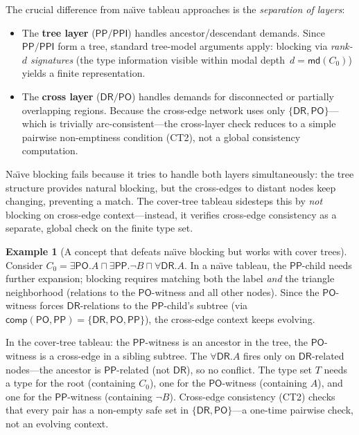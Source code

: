 \documentclass[
]{ceurart}
\theoremstyle{definition}
\newtheorem{examplex}[theorem]{Example}
\newcommand{\DR}{\ensuremath{\mathsf{DR}}}
\newcommand{\PO}{\ensuremath{\mathsf{PO}}}
\newcommand{\PP}{\ensuremath{\mathsf{PP}}}
\newcommand{\PPI}{\ensuremath{\mathsf{PPI}}}
\newcommand{\comp}{\ensuremath{\mathsf{comp}}}
\newcommand{\md}{\ensuremath{\mathsf{md}}}
\begin{document}
The crucial difference from na\"{\i}ve tableau approaches is the
\emph{separation of layers}:

\begin{itemize}
  \item The \textbf{tree layer} ($\PP/\PPI$) handles
    ancestor/descendant demands.  Since $\PP/\PPI$ form a tree,
    standard tree-model arguments apply: blocking via
    \emph{rank-$d$ signatures} (the type information visible
    within modal depth~$d = \md(C_0)$) yields a finite
    representation.

  \item The \textbf{cross layer} ($\DR/\PO$) handles demands for
    disconnected or partially overlapping regions.  Because the
    cross-edge network uses only $\{\DR,\PO\}$---which is
    trivially arc-consistent---the cross-layer check reduces to a
    simple pairwise non-emptiness condition (CT2), not a global
    consistency computation.
\end{itemize}

Na\"{\i}ve blocking fails because it tries to handle both layers
simultaneously: the tree structure provides natural blocking, but
the cross-edges to distant nodes keep changing, preventing a match.
The cover-tree tableau sidesteps this by \emph{not} blocking on
cross-edge context---instead, it verifies cross-edge consistency
as a separate, global check on the finite type set.

\begin{examplex}[A concept that defeats na\"{\i}ve blocking but
  works with cover trees]
\label{ex:cover-tree-win}
Consider $C_0 = \exists\PO.A \sqcap \exists\PP.\neg B \sqcap
\forall\DR.A$.
In a na\"{\i}ve tableau, the $\PP$-child needs further expansion;
blocking requires matching both the label \emph{and} the
triangle neighborhood (relations to the $\PO$-witness and all
other nodes).  Since the $\PO$-witness forces $\DR$-relations
to the $\PP$-child's subtree (via $\comp(\PO, \PP) = \{\DR,\PO,\PP\}$),
the cross-edge context keeps evolving.

In the cover-tree tableau: the $\PP$-witness is an ancestor in
the tree, the $\PO$-witness is a cross-edge in a sibling subtree.
The $\forall\DR.A$ fires only on $\DR$-related nodes---the
ancestor is $\PP$-related (not $\DR$), so no conflict.
The type set $T$ needs a type for the root (containing $C_0$),
one for the $\PO$-witness (containing $A$), and one for the
$\PP$-witness (containing $\neg B$).  Cross-edge consistency
(CT2) checks that every pair has a non-empty safe set in
$\{\DR,\PO\}$---a one-time pairwise check, not an evolving
context.
\end{examplex}
\end{document}
